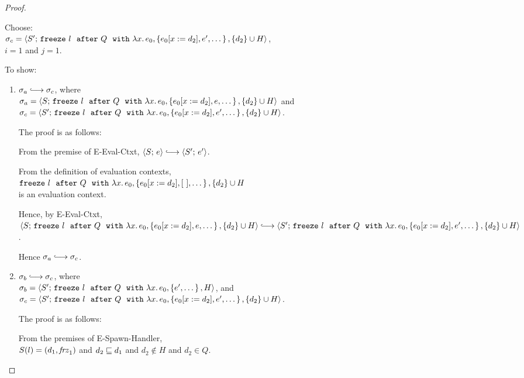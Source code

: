 \begin{proof}
\begin{itemize}
\begin{itemize}
        Choose: \\
        $\sigma_c = \langle S';\, \mbox{\texttt{freeze}}~l~~{\mbox{\texttt{after}}}~Q~~{\mbox{\texttt{with}}}~\lambda x.\,e_0, \left\{e_0[x := d_2],
              e', \dots\right\}, \{d_2\}\cup H \rangle$, \\
        $i = 1$ and $j = 1$.

        To show:
        \begin{enumerate}
        \item $\conf_a \parstepsto \conf_c$, where \\
          $\sigma_a = \langle S;\, \mbox{\texttt{freeze}}~l~~{\mbox{\texttt{after}}}~Q~~{\mbox{\texttt{with}}}~\lambda x.\,e_0, \left\{e_0[x := d_2],
              e, \dots\right\}, \{d_2\}\cup H \rangle$ and \\
          $\sigma_c = \langle S';\, \mbox{\texttt{freeze}}~l~~{\mbox{\texttt{after}}}~Q~~{\mbox{\texttt{with}}}~\lambda x.\,e_0, \left\{e_0[x := d_2],
                e', \dots\right\}, \{d_2\}\cup H \rangle$.

          The proof is as follows:

          From the premise of {\sc E-Eval-Ctxt}, $\config{S}{e}
          \parstepsto \config{S'}{e'}$.

          From the definition of evaluation contexts, \\
          $\mbox{\texttt{freeze}}~l~~{\mbox{\texttt{after}}}~Q~~{\mbox{\texttt{with}}}~\lambda x.\,e_0, \left\{e_0[x := d_2],
                [~], \dots\right\}, \{d_2\}\cup H$ \\
          is an evaluation context.

          Hence, by {\sc E-Eval-Ctxt}, \\
          $\config{S}{\freezeafterfull{l}{Q}{\lam{x}{e_0}}{\setof{\subst{e_0}{x}{d_2},
              e, \dots}} {\{d_2\}\cup H}} \parstepsto \\
          \config{S'}{\freezeafterfull{l}{Q}{\lam{x}{e_0}}{\setof{\subst{e_0}{x}{d_2},
                e', \dots}} {\{d_2\}\cup H}}$.
          
          Hence $\conf_a \parstepsto \conf_c$.

        \item $\conf_b \parstepsto \conf_c$, where \\
          $\sigma_b = \langle S';\, \mbox{\texttt{freeze}}~l~~{\mbox{\texttt{after}}}~Q~~{\mbox{\texttt{with}}}~\lambda x.\,e_0, \left\{e',
              \dots\right\}, H \rangle$, and \\
          $\sigma_c = \langle S';\, \mbox{\texttt{freeze}}~l~~{\mbox{\texttt{after}}}~Q~~{\mbox{\texttt{with}}}~\lambda x.\,e_0, \left\{e_0[x := d_2],
              e', \dots\right\}, \{d_2\}\cup H \rangle$.

          The proof is as follows:

          From the premises of {\sc E-Spawn-Handler}, \\
          $S(l) = (d_1, \mathit{frz}_1)$ and
          $d_2 \sqsubseteq d_1$ and 
          $d_2 \notin H$ and
          $d_2 \in Q$.


\end{enumerate}
\end{itemize}
\end{itemize}
\end{proof}
